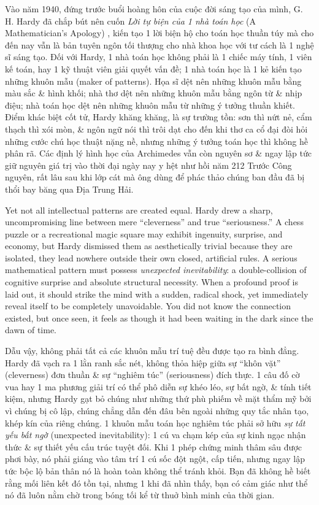 \documentclass[11pt]{article}
\begin{document}
Vào năm 1940, đứng trước buổi hoàng hôn của cuộc đời sáng tạo của mình, G. H. Hardy đã chắp bút nên cuốn \textit{Lời tự biện của 1 nhà toán học} (A Mathematician's Apology) \cite{Hardy1940}, kiến tạo 1 lời biện hộ cho toán học thuần túy mà cho đến nay vẫn là bản tuyên ngôn tối thượng cho nhà khoa học với tư cách là 1 nghệ sĩ sáng tạo. Đối với Hardy, 1 nhà toán học không phải là 1 chiếc máy tính, 1 viên kế toán, hay 1 kỹ thuật viên giải quyết vấn đề; 1 nhà toán học là 1 kẻ kiến tạo những khuôn mẫu (maker of patterns). Họa sĩ dệt nên những khuôn mẫu bằng màu sắc \& hình khối; nhà thơ dệt nên những khuôn mẫu bằng ngôn từ \& nhịp điệu; nhà toán học dệt nên những khuôn mẫu từ những ý tưởng thuần khiết. Điểm khác biệt cốt tử, Hardy khăng khăng, là sự trường tồn: sơn thì nứt nẻ, cẩm thạch thì xói mòn, \& ngôn ngữ nói thì trôi dạt cho đến khi thơ ca cổ đại đòi hỏi những cước chú học thuật nặng nề, nhưng những ý tưởng toán học thì không hề phân rã. Các định lý hình học của Archimedes vẫn còn nguyên sơ \& ngay lập tức giữ nguyên giá trị vào thời đại ngày nay y hệt như hồi năm 212 Trước Công nguyên, rất lâu sau khi lớp cát mà ông dùng để phác thảo chúng ban đầu đã bị thổi bay băng qua Địa Trung Hải.

Yet not all intellectual patterns are created equal. Hardy drew a sharp, uncompromising line between mere ``cleverness'' and true ``seriousness.'' A chess puzzle or a recreational magic square may exhibit ingenuity, surprise, and economy, but Hardy dismissed them as aesthetically trivial because they are isolated, they lead nowhere outside their own closed, artificial rules. A serious mathematical pattern must possess \emph{unexpected inevitability}: a double-collision of cognitive surprise and absolute structural necessity. When a profound proof is laid out, it should strike the mind with a sudden, radical shock, yet immediately reveal itself to be completely unavoidable. You did not know the connection existed, but once seen, it feels as though it had been waiting in the dark since the dawn of time.

Dẫu vậy, không phải tất cả các khuôn mẫu trí tuệ đều được tạo ra bình đẳng. Hardy đã vạch ra 1 lằn ranh sắc nét, không thỏa hiệp giữa sự ``khôn vặt'' (cleverness) đơn thuần \& sự ``nghiêm túc'' (seriousness) đích thực. 1 câu đố cờ vua hay 1 ma phương giải trí có thể phô diễn sự khéo léo, sự bất ngờ, \& tính tiết kiệm, nhưng Hardy gạt bỏ chúng như những thứ phù phiếm về mặt thẩm mỹ bởi vì chúng bị cô lập, chúng chẳng dẫn đến đâu bên ngoài những quy tắc nhân tạo, khép kín của riêng chúng. 1 khuôn mẫu toán học nghiêm túc phải sở hữu \emph{sự tất yếu bất ngờ} (unexpected inevitability): 1 cú va chạm kép của sự kinh ngạc nhận thức \& sự thiết yếu cấu trúc tuyệt đối. Khi 1 phép chứng minh thâm sâu được phơi bày, nó phải giáng vào tâm trí 1 cú sốc đột ngột, cấp tiến, nhưng ngay lập tức bộc lộ bản thân nó là hoàn toàn không thể tránh khỏi. Bạn đã không hề biết rằng mối liên kết đó tồn tại, nhưng 1 khi đã nhìn thấy, bạn có cảm giác như thể nó đã luôn nằm chờ trong bóng tối kể từ thuở bình minh của thời gian.
\end{document}
